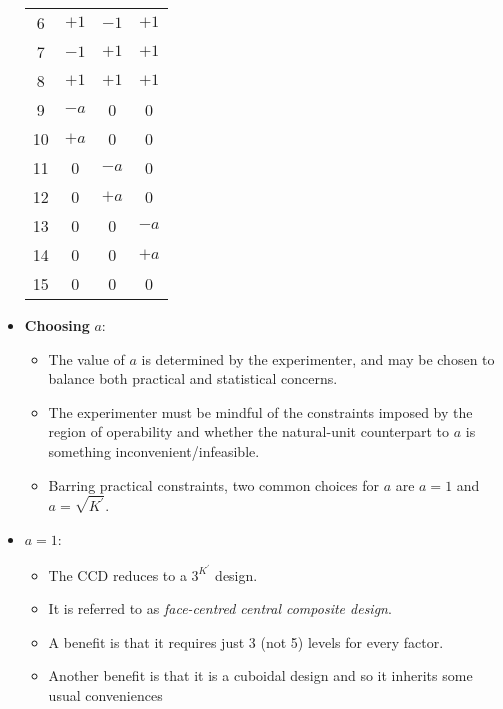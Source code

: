 \begin{itemize}
\begin{table}[!htbp]
\begin{tabular}{cccc}
                  6                  & $+1$    & $-1$    & $+1$    \\
                  7                  & $-1$    & $+1$    & $+1$    \\
                  8                  & $+1$    & $+1$    & $+1$    \\
                  9                  & $-a$    & 0       & 0       \\
                  10                 & $+a$    & 0       & 0       \\
                  11                 & 0       & $-a$    & 0       \\
                  12                 & 0       & $+a$    & 0       \\
                  13                 & 0       & 0       & $-a$    \\
                  14                 & 0       & 0       & $+a$    \\
                  15                 & 0       & 0       & 0       \\
                  \bottomrule
              \end{tabular}
          \end{table}
    \item \textbf{Choosing} $ a $:
          \begin{itemize}
              \item The value of $ a $ is determined by the experimenter, and may be chosen to balance both practical
                    and statistical concerns.
              \item The experimenter must be mindful of the constraints imposed by the region of operability and
                    whether the natural-unit counterpart to $ a $ is something inconvenient/infeasible.
              \item Barring practical constraints, two common choices for $ a $ are $ a=1 $ and $ a=\sqrt{K^\prime} $.
          \end{itemize}
    \item $ a=1 $:
          \begin{itemize}
              \item The CCD reduces to a $ 3^{K^\prime} $ design.
              \item It is referred to as \emph{face-centred central composite design}.
              \item A benefit is that it requires just 3 (not 5) levels for every factor.
              \item Another benefit is that it is a cuboidal design and so it inherits some usual conveniences

\end{itemize}
\end{itemize}
